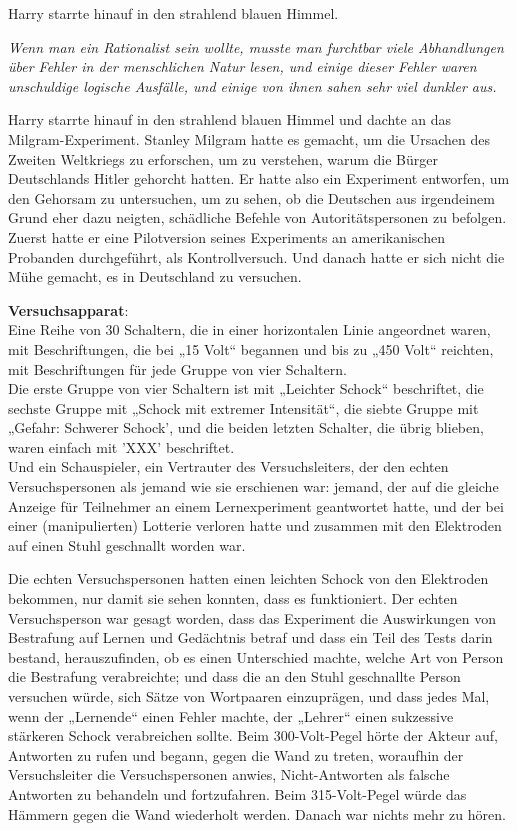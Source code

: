 {Harry starrte hinauf in den strahlend blauen Himmel.

\emph{Wenn man ein Rationalist sein wollte, musste man furchtbar viele Abhandlungen über Fehler in der menschlichen Natur lesen, und einige dieser Fehler waren unschuldige logische Ausfälle, und einige von ihnen sahen sehr viel dunkler aus.}

Harry starrte hinauf in den strahlend blauen Himmel und dachte an das Milgram-Experiment. Stanley Milgram hatte es gemacht, um die Ursachen des Zweiten Weltkriegs zu erforschen, um zu verstehen, warum die Bürger Deutschlands Hitler gehorcht hatten. Er hatte also ein Experiment entworfen, um den Gehorsam zu untersuchen, um zu sehen, ob die Deutschen aus irgendeinem Grund eher dazu neigten, schädliche Befehle von Autoritätspersonen zu befolgen. Zuerst hatte er eine Pilotversion seines Experiments an amerikanischen Probanden durchgeführt, als Kontrollversuch. Und danach hatte er sich nicht die Mühe gemacht, es in Deutschland zu versuchen.

\textbf{Versuchsapparat}:\\ Eine Reihe von 30 Schaltern, die in einer horizontalen Linie angeordnet waren, mit Beschriftungen, die bei „15 Volt“ begannen und bis zu „450 Volt“ reichten, mit Beschriftungen für jede Gruppe von vier Schaltern.\\ Die erste Gruppe von vier Schaltern ist mit „Leichter Schock“ beschriftet, die sechste Gruppe mit „Schock mit extremer Intensität“, die siebte Gruppe mit „Gefahr: Schwerer Schock', und die beiden letzten Schalter, die übrig blieben, waren einfach mit 'XXX' beschriftet.\\ Und ein Schauspieler, ein Vertrauter des Versuchsleiters, der den echten Versuchspersonen als jemand wie sie erschienen war: jemand, der auf die gleiche Anzeige für Teilnehmer an einem Lernexperiment geantwortet hatte, und der bei einer (manipulierten) Lotterie verloren hatte und zusammen mit den Elektroden auf einen Stuhl geschnallt worden war.

Die echten Versuchspersonen hatten einen leichten Schock von den Elektroden bekommen, nur damit sie sehen konnten, dass es funktioniert. Der echten Versuchsperson war gesagt worden, dass das Experiment die Auswirkungen von Bestrafung auf Lernen und Gedächtnis betraf und dass ein Teil des Tests darin bestand, herauszufinden, ob es einen Unterschied machte, welche Art von Person die Bestrafung verabreichte; und dass die an den Stuhl geschnallte Person versuchen würde, sich Sätze von Wortpaaren einzuprägen, und dass jedes Mal, wenn der „Lernende“ einen Fehler machte, der „Lehrer“ einen sukzessive stärkeren Schock verabreichen sollte. Beim 300-Volt-Pegel hörte der Akteur auf, Antworten zu rufen und begann, gegen die Wand zu treten, woraufhin der Versuchsleiter die Versuchspersonen anwies, Nicht-Antworten als falsche Antworten zu behandeln und fortzufahren. Beim 315-Volt-Pegel würde das Hämmern gegen die Wand wiederholt werden. Danach war nichts mehr zu hören.

}
